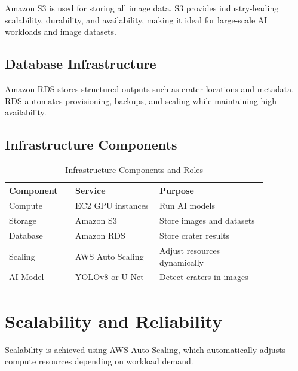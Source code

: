 \documentclass[conference]{IEEEtran}
\begin{document}
	Amazon S3 is used for storing all image data. S3 provides industry-leading scalability, durability, and availability, making it ideal for large-scale AI workloads and image datasets.
	
	\subsection{Database Infrastructure}
	
	Amazon RDS stores structured outputs such as crater locations and metadata. RDS automates provisioning, backups, and scaling while maintaining high availability.
	
	\subsection{Infrastructure Components}
	
	\begin{table}[ht]
		\centering
		\caption{Infrastructure Components and Roles}
		\begin{tabular}{|p{0.22\linewidth}|p{0.28\linewidth}|p{0.36\linewidth}|}
			\hline
			\textbf{Component} & \textbf{Service} & \textbf{Purpose} \\ \hline
			Compute & EC2 GPU instances & Run AI models \\ \hline
			Storage & Amazon S3 & Store images and datasets \\ \hline
			Database & Amazon RDS & Store crater results \\ \hline
			Scaling & AWS Auto Scaling & Adjust resources dynamically \\ \hline
			AI Model & YOLOv8 or U-Net & Detect craters in images \\ \hline
		\end{tabular}
	\end{table}
	
	\section{Scalability and Reliability}
	
	Scalability is achieved using AWS Auto Scaling, which automatically adjusts compute resources depending on workload demand.
	
\end{document}
